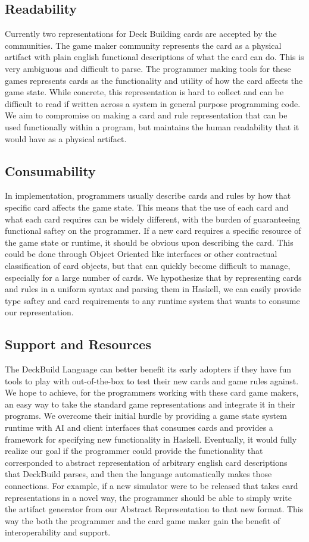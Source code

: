 \subsection{Readability}
Currently two representations for Deck Building cards are accepted by the communities. The game maker
community represents the card as a physical artifact with plain english functional descriptions
of what the card can do. This is very ambiguous and difficult to parse. The
programmer making tools for these games represents cards as the functionality and utility of how the
card affects the game state. While concrete, this representation is hard to collect and can be difficult to read
if written across a system in general purpose programming code. We aim to compromise
on making a card and rule representation that can be used functionally within a program, but maintains
the human readability that it would have as a physical artifact.
\subsection{Consumability}
In implementation, programmers usually describe cards and rules by how that specific card affects the game
state. This means that the use of each card and what each card requires can be widely different, with the burden
of guaranteeing functional saftey on the programmer. If a new card requires a specific resource of the game
state or runtime, it should be obvious upon describing the card. This could be done through Object Oriented like interfaces or other contractual classification
of card objects, but that can quickly become difficult to manage, especially for a large number of cards. We hypothesize that
by representing cards and rules in a uniform syntax and parsing them in Haskell, we can easily provide type saftey and
card requirements to any runtime system that wants to consume our representation.
\subsection{Support and Resources}
The DeckBuild Language can better benefit its early adopters if they have fun tools to play with out-of-the-box to test their new cards and game rules against.
We hope to achieve, for the programmers working
with these card game makers, an easy way to take the standard game representations and integrate it in their
programs. We overcome their initial hurdle by providing a game state system runtime with AI and client interfaces
that consumes cards and provides a framework for specifying new functionality in Haskell. Eventually, it would fully
realize our goal if the programmer could provide the functionality that corresponded to abstract representation of arbitrary
english card descriptions that DeckBuild parses, and then the language automatically makes those connections. For example, if a new
simulator were to be released that takes card representations in a novel way, the programmer should be able to simply write the artifact
generator from our Abstract Representation to that new format. This way the both the programmer and the card game maker gain the benefit
of interoperability and support.
